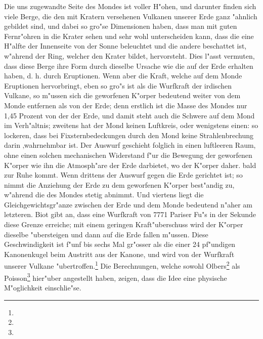 \documentclass[a4paper, 11pt, oneside]{article}
\begin{document}
Die uns zugewandte Seite des Mondes ist voller H"ohen, und darunter finden sich viele Berge, die den mit Kratern versehenen Vulkanen unserer Erde ganz "ahnlich gebildet sind, und dabei so gro"se Dimensionen haben, dass man mit guten Fernr"ohren in die Krater sehen und sehr wohl unterscheiden kann, dass die eine H"alfte der Innenseite von der Sonne beleuchtet und die andere beschattet ist, w"ahrend der Ring, welcher den Krater bildet, hervorsteht. Dies l"asst vermuten, dass diese Berge ihre Form durch dieselbe Ursache wie die auf der Erde erhalten haben, d. h. durch Eruptionen. Wenn aber die Kraft, welche auf dem Monde Eruptionen hervorbringt, eben so gro"s ist als die Wurfkraft der irdischen Vulkane, so m"ussen sich die geworfenen K"orper bedeutend weiter von dem Monde entfernen als von der Erde; denn erstlich ist die Masse des Mondes nur 1,45 Prozent von der der Erde, und damit steht auch die Schwere auf dem Mond im Verh"altnis; zweitens hat der Mond keinen Luftkreis, oder wenigstens einen: so lockeren, dass bei Fixsternbedeckungen durch den Mond keine Strahlenbrechung darin ‚wahrnehmbar ist. Der Auswurf geschieht folglich in einen luftleeren Raum, ohne einen solchen mechanischen Widerstand f"ur die Bewegung der geworfenen K"orper wie ihn die Atmosph"are der Erde darbietet, wo der K"orper daher. bald zur Ruhe kommt. Wenn drittens der Auswurf gegen die Erde gerichtet ist; so nimmt die Anziehung der Erde zu dem geworfenen K"orper best"andig zu, w"ahrend die des Mondes stetig abnimmt. Und viertens liegt die Gleichgewichtsgr"anze zwischen der Erde und dem Monde bedeutend n"aher am letzteren. Biot gibt an, dass eine Wurfkraft von 7771 Pariser Fu"s in der Sekunde diese Grenze erreiche; mit einem geringen Kraft"uberschuss wird der K"orper dieselbe "ubersteigen und dann auf die Erde fallen m"ussen. Diese Geschwindigkeit ist f"unf bis sechs Mal gr"osser als die einer 24 pf"undigen Kanonenkugel beim Austritt aus der Kanone, und wird von der Wurfkraft unserer Vulkane "ubertroffen.\footnote{} Die Berechnungen, welche sowohl Olbers\footnote{} als Poisson\footnote{} hier"uber angestellt haben, zeigen, dass die Idee eine physische M"oglichkeit einschlie"se.
\end{document}
